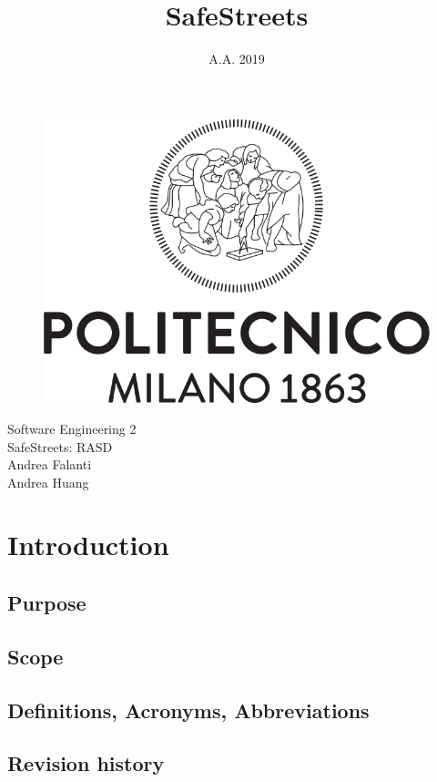 \documentclass[12pt]{article}
\title{SafeStreets}
\date{A.A. 2019}
\begin{document}
\clearpage
\begin{figure}
    \centering
    \includegraphics[width=\linewidth]{Logo_Politecnico_Milano.png}
    \label{fig:my_label}
\end{figure}


{
    \centering
    \Huge Software Engineering 2\\
    \Huge SafeStreets: RASD\\
    \vspace*{\fill}
    \large Andrea Falanti\\
    \large Andrea Huang
    \par
}
    
\thispagestyle{empty}

\newpage
\tableofcontents

\newpage
\section{Introduction}
    \subsection{Purpose}
        
    \subsection{Scope}
        
    \subsection{Definitions, Acronyms, Abbreviations}
    \subsection{Revision history}
\end{document}
